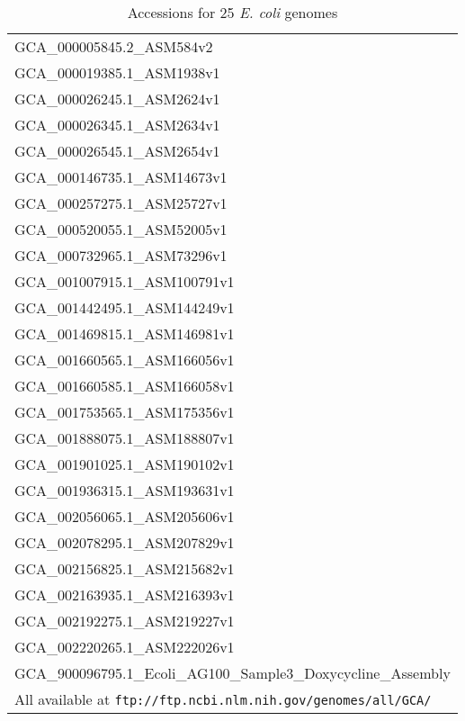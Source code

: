 \documentclass[10pt]{article}
\begin{document}
\begin{table}[!h]
\centering
\caption{Accessions for 25 \textit{E. coli} genomes}
\label{table:accessions}
\begin{tabular}{l}
  \toprule

  GCA\_000005845.2\_ASM584v2                    \\
  GCA\_000019385.1\_ASM1938v1                   \\
  GCA\_000026245.1\_ASM2624v1                   \\
  GCA\_000026345.1\_ASM2634v1                   \\
  GCA\_000026545.1\_ASM2654v1                   \\
  GCA\_000146735.1\_ASM14673v1                  \\
  GCA\_000257275.1\_ASM25727v1                  \\
  GCA\_000520055.1\_ASM52005v1                  \\
  GCA\_000732965.1\_ASM73296v1                  \\
  GCA\_001007915.1\_ASM100791v1                 \\
  GCA\_001442495.1\_ASM144249v1                 \\
  GCA\_001469815.1\_ASM146981v1                 \\
  GCA\_001660565.1\_ASM166056v1                 \\
  GCA\_001660585.1\_ASM166058v1                 \\
  GCA\_001753565.1\_ASM175356v1                 \\
  GCA\_001888075.1\_ASM188807v1                 \\
  GCA\_001901025.1\_ASM190102v1                 \\
  GCA\_001936315.1\_ASM193631v1                 \\
  GCA\_002056065.1\_ASM205606v1                 \\
  GCA\_002078295.1\_ASM207829v1                 \\
  GCA\_002156825.1\_ASM215682v1                 \\
  GCA\_002163935.1\_ASM216393v1                 \\
  GCA\_002192275.1\_ASM219227v1                 \\
  GCA\_002220265.1\_ASM222026v1                 \\
  GCA\_900096795.1\_Ecoli\_AG100\_Sample3\_Doxycycline\_Assembly \\
  \bottomrule
  {\tiny   All available at \texttt{ftp://ftp.ncbi.nlm.nih.gov/genomes/all/GCA/}}

\end{tabular}
\end{table}
\end{document}
